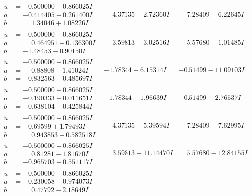 \documentclass[1p]{elsarticle_modified}
\theoremstyle{definition}
\begin{document}
$$\begin{array}{c|c|c}
\begin{aligned}
u &= -0.500000 + 0.866025 I \\
a &= -0.414405 - 0.261400 I \\
b &= \phantom{-}1.34046 + 1.08226 I\end{aligned}
 & \phantom{-}4.37135 + 2.72360 I & \phantom{-}7.28409 - 6.22645 I \\ \hline\begin{aligned}
u &= -0.500000 + 0.866025 I \\
a &= \phantom{-}0.464951 + 0.136300 I \\
b &= -1.48453 - 0.90150 I\end{aligned}
 & \phantom{-}3.59813 - 3.02516 I & \phantom{-}5.57680 - 1.01485 I \\ \hline\begin{aligned}
u &= -0.500000 + 0.866025 I \\
a &= \phantom{-}0.88808 - 1.41024 I \\
b &= -0.832563 + 0.485697 I\end{aligned}
 & -1.78344 + 6.15314 I & -0.51499 - 11.09103 I \\ \hline\begin{aligned}
u &= -0.500000 + 0.866025 I \\
a &= -0.190333 + 0.011651 I \\
b &= -0.638104 - 0.425844 I\end{aligned}
 & -1.78344 + 1.96639 I & -0.51499 - 2.76537 I \\ \hline\begin{aligned}
u &= -0.500000 + 0.866025 I \\
a &= -0.69599 + 1.79493 I \\
b &= \phantom{-}0.943853 - 0.582518 I\end{aligned}
 & \phantom{-}4.37135 + 5.39594 I & \phantom{-}7.28409 - 7.62995 I \\ \hline\begin{aligned}
u &= -0.500000 + 0.866025 I \\
a &= \phantom{-}0.81281 - 1.81670 I \\
b &= -0.965703 + 0.551117 I\end{aligned}
 & \phantom{-}3.59813 + 11.14470 I & \phantom{-}5.57680 - 12.84155 I \\ \hline\begin{aligned}
u &= -0.500000 - 0.866025 I \\
a &= -0.230058 + 0.974073 I \\
b &= \phantom{-}0.47792 - 2.18649 I\end{aligned}

\end{array}$$
\end{document}
